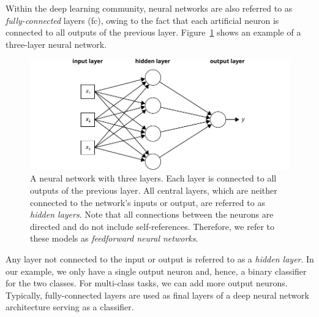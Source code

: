 Within the deep learning community, neural networks are also referred to as \emph{fully-connected} layers (\ac{fc}), owing to the fact that each artificial neuron is connected to all outputs of the previous layer. Figure~\ref{fig:nn} shows an example of a three-layer neural network.
%
	\begin{figure}[tp]
  		\centering
    	\includegraphics{img/nn.pdf}
    	\caption{A neural network with three layers. Each layer is connected to all outputs of the previous layer. All central layers, which are neither connected to the network's inputs or output, are referred to as \emph{hidden layers}. Note that all connections between the neurons are directed and do not include self-references. Therefore, we refer to these models as \emph{feedforward neural networks}.}
    	\label{fig:nn}
	\end{figure}
%
Any layer not connected to the input or output is referred to as a \emph{hidden layer}. In our example, we only have a single output neuron and, hence, a binary classifier for the two classes. For multi-class tasks, we can add more output neurons. Typically, fully-connected layers are used as final layers of a deep neural network architecture serving as a classifier.

